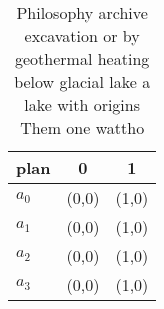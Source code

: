 \documentclass[a4paper]{article}
\begin{document}
\begin{table}
\begin{adjustbox}{width=0.8\columnwidth}
\begin{tabular}{|l|l|l|}
\hline
\textbf{plan} & \multicolumn{1}{c|}{\textbf{0}} & \multicolumn{1}{c|}{\textbf{1}} \\ \hline
\textbf{$a_0$}  & (0,0) & (1,0) \\ \hline
\textbf{$a_1$}  & (0,0) & (1,0) \\ \hline
\textbf{$a_2$}  & (0,0) & (1,0) \\ \hline
\textbf{$a_3$}  & (0,0) & (1,0) \\ \hline
\end{tabular}
\end{adjustbox}
\caption{Philosophy archive excavation or by geothermal heating below glacial lake a lake with origins Them one wattho
}
\end{table}
\end{document}
